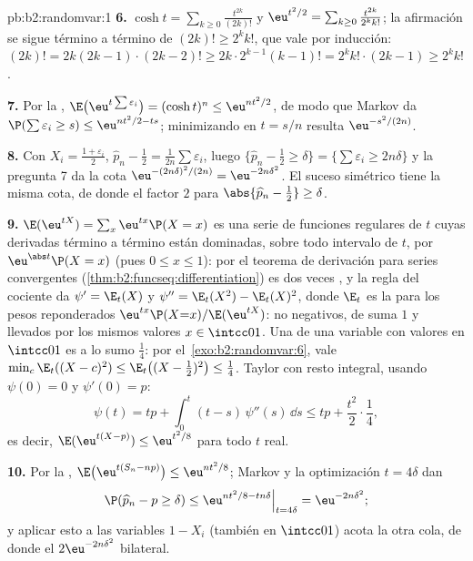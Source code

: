 \begin{solution}{pb:b2:randomvar:1}
\textbf{6.} $\cosh t = \sum_{k\geq0}\frac{t^{2k}}{(2k)!}$ y
$\eu^{t^2/2} = \sum_{k\geq0}\frac{t^{2k}}{2^kk!}$; la afirmación se
sigue término a término de $(2k)! \geq 2^kk!$, que vale por
inducción: $(2k)! = 2k(2k-1)\cdot(2k-2)! \geq 2k\cdot 2^{k-1}(k-1)! =
2^kk!\cdot(2k-1) \geq 2^kk!$.

\textbf{7.} Por la ,
$\E\bigl(\eu^{t\sum\varepsilon_i} \bigr) = (\cosh t)^n \leq
\eu^{nt^2/2}$, de modo que Markov da $\P(\sum\varepsilon_i \geq s)
\leq \eu^{nt^2/2 - ts}$; minimizando en $t = s/n$ resulta
$\eu^{-s^2/(2n)}$.

\textbf{8.} Con $X_i = \frac{1 + \varepsilon_i}2$, $\widehat p_n -
\frac12 = \frac1{2n}\sum\varepsilon_i$, luego $\{\widehat p_n -
\frac12 \geq \delta\} = \{\sum\varepsilon_i \geq 2n\delta\}$ y la
pregunta 7 da la cota $\eu^{-(2n\delta)^2/(2n)} =
\eu^{-2n\delta^2}$. El suceso simétrico tiene la misma cota, de donde
el factor $2$ para $\abs{\widehat p_n - \frac12} \geq \delta$.

\textbf{9.} $\E(\eu^{tX}) = \sum_x\eu^{tx}\P(X = x)$ es una serie de
funciones regulares de $t$ cuyas derivadas término a término están
dominadas, sobre todo intervalo  de $t$, por
$\eu^{\abs t}\P(X = x)$ (pues $0 \leq x \leq 1$): por el teorema de
derivación para series  convergentes
(\cref{thm:b2:funcseq:differentiation}) es dos veces
, y la regla del cociente da $\psi' = \E_t(X)$ y
$\psi'' = \E_t(X^2) - \E_t(X)^2$, donde $\E_t$ es la  para
los pesos reponderados $\eu^{tx}\P(X{=}x)/\E(\eu^{tX})$: no
negativos, de suma $1$ y llevados por los mismos valores $x \in
\intcc01$. Una  de una variable con valores en $\intcc01$ es
a lo sumo $\frac14$: por el~\cref{exo:b2:randomvar:6}, vale
$\min_c\E_t((X - c)^2) \leq \E_t\bigl((X - \tfrac12)^2\bigr) \leq
\tfrac14$. Taylor con resto integral, usando $\psi(0) = 0$ y
$\psi'(0) = p$:
\[
\psi(t) = tp + \int_0^t(t - s)\,\psi''(s)\,\dd s
\leq tp + \frac{t^2}2\cdot\frac14,
\]
es decir, $\E(\eu^{t(X - p)}) \leq \eu^{t^2/8}$ para todo $t$ real.

\textbf{10.} Por la , $\E\bigl(\eu^{t(S_n - np)}\bigr)
\leq \eu^{nt^2/8}$; Markov y la optimización $t = 4\delta$ dan
\[
\P(\widehat p_n - p \geq \delta)
\leq \eu^{nt^2/8 - tn\delta}\Big|_{t = 4\delta}
= \eu^{-2n\delta^2};
\]
y aplicar esto a las variables $1 - X_i$ (también en $\intcc01$)
acota la otra cola, de donde el $2\eu^{-2n\delta^2}$ bilateral.


\end{solution}
